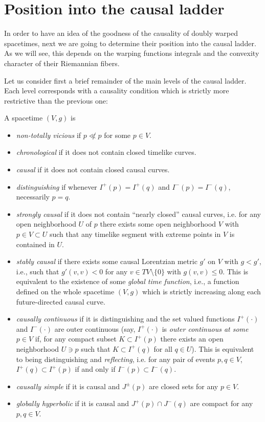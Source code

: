 \section{Position into the causal ladder}
\label{sec:causalladder}
In order to have an idea of the goodness of the causality of doubly warped spacetimes, next we are going to
determine their position into the causal ladder. As we will see, this depends on the warping functions integrals and the convexity character of their Riemannian fibers.

Let us consider first a brief remainder of the main levels of the causal ladder. Each level corresponds with a causality condition which is strictly more restrictive than the previous one:
\begin{defi}\label{ant} A spacetime $(V,g)$ is
\begin{itemize}
\item {\em non-totally vicious} if $p\not\ll p$ for some $p\in V$.

\item {\em chronological} if it does not contain closed timelike curves.

\item {\em causal} if it does not contain closed causal curves.

\item {\em distinguishing} if whenever $I^+(p)=I^+(q)$ and $I^-(p)=I^-(q)$, necessarily $p=q$.

\item{\em strongly causal} if it does not contain ``nearly closed'' causal curves, i.e. for any open neighborhood $U$ of $p$ there exists some open neighborhood $V$ with $p\in V\subset U$ such that any timelike segment with extreme points in $V$ is contained in $U$.

\item {\em stably causal} if there exists some causal Lorentzian metric $g'$ on $V$ with $g<g'$, i.e., such that $g'(v,v)<0$ for any $v\in TV\setminus \{0\}$ with $g(v,v)\leq 0$. This is equivalent to the existence of some {\em global time function}, i.e., a function defined on the whole spacetime $(V,g)$ which is strictly increasing along each future-directed causal curve.

\item {\em causally continuous} if it is distinguishing and the set valued functions $I^{+}(\cdot)$ and $I^{-}(\cdot)$ are outer continuous (say, $I^{+}(\cdot)$ is {\em outer continuous at some} $p\in V$ if, for any compact subset $K\subset I^{+}(p)$ there exists an open neighborhood $U\ni p$ such that $K\subset I^{+}(q)$ for all $q\in U$). This is equivalent to being distinguishing and {\em reflecting}, %
i.e. for any pair of events $p,q \in V$, $I^{+}(q) \subset I^{+}(p)$ if and only if $I^{-}(p) \subset I^{-}(q)$.

\item {\em causally simple} if it is causal and $J^{\pm}(p)$ are closed sets for any $p\in V$.

\item {\em globally hyperbolic} if it is causal and $J^{+}(p)\cap J^{-}(q)$ are compact for any $p,q \in V$.
\end{itemize}
\end{defi}
